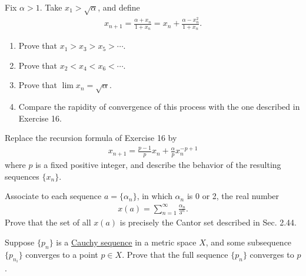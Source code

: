   \begin{exercise}[Rudin 3.17]
    Fix $\alpha > 1$. Take $x_1 > \sqrt{\alpha}$, and define
    \begin{align*}
      x_{n+1} = \frac{\alpha + x_n}{1 + x_n} = x_n + \frac{\alpha - x_n^2}{1 + x_n}.
    \end{align*}
    \begin{enumerate} 
      \item[(a)] Prove that $x_1 > x_3 > x_5 > \cdots$.
      \item[(b)] Prove that $x_2 < x_4 < x_6 < \cdots$.
      \item[(c)] Prove that $\lim x_n = \sqrt{\alpha}$.
      \item[(d)] Compare the rapidity of convergence of this process with the one described in Exercise 16.
    \end{enumerate}
  \end{exercise}
  \begin{solution}
    
  \end{solution}

  \begin{exercise}[Rudin 3.18]
    Replace the recursion formula of Exercise 16 by
    \begin{align*}
      x_{n+1} = \frac{p-1}{p}x_n + \frac{\alpha}{p}x_n^{-p+1}
    \end{align*}
    where $p$ is a fixed positive integer, and describe the behavior of the resulting sequences $\{x_n\}$.
  \end{exercise}
  \begin{solution}
    
  \end{solution}

  \begin{exercise}[Rudin 3.19]
    Associate to each sequence $a = \{\alpha_n\}$, in which $\alpha_n$ is 0 or 2, the real number
    \begin{align*}
      x(a) = \sum_{n=1}^{\infty} \frac{\alpha_n}{3^n}.
    \end{align*}
    Prove that the set of all $x(a)$ is precisely the Cantor set described in Sec. 2.44.
  \end{exercise}
  \begin{solution}
    
  \end{solution}

  \begin{exercise}[Rudin 3.20]
    Suppose $\{p_n\}$ is a \hyperref[def:cauchy-sequence]{Cauchy sequence} in a metric space $X$, and some subsequence $\{p_{n_i}\}$ converges to a point $p \in X$. Prove that the full sequence $\{p_n\}$ converges to $p$.
  \end{exercise}
  \begin{solution}
    
  \end{solution}

